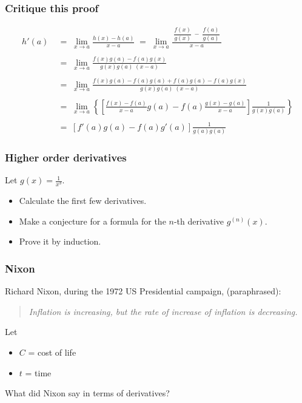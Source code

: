 \begin{frame}[t]
	\fontsize{13}{13}\selectfont
	\frametitle{Critique this proof}
	\vspace{-1cm}
	\begin{align*}
		h'(a) \; & = \; \lim_{x \to a}\frac{h(x) - h(a) }{x - a}\; = \; \lim_{x \to a}\frac{\; \dfrac{f(x)}{g(x)} \; - \; \dfrac{f(a)}{g(a)} \;}{x-a} \\
		\         \\
		         & = \; \lim_{x \to a}\frac{f(x)g(a) - f(a)g(x)}{g(x)g(a) \; (x-a)}                                                                   \\
		\         \\
		         & = \; \lim_{x \to a}\frac{f(x)g(a) - f(a)g(a) + f(a)g(a) - f(a) g(x)}{g(x) g(a) \; (x-a)}                                           \\
		\         \\
		         & = \; \lim_{x \to a}\left\{ \left[ \frac{f(x) - f(a)}{x-a}g(a) - f(a) \frac{g(x) - g(a)}{x-a}\right] \frac{1}{g(x) g(a)}\right\}    \\
		\         \\
		         & = \; \left[ f'(a) g(a) - f(a) g'(a) \right] \frac{1}{g(a) g(a)}
	\end{align*}
\end{frame}

\begin{frame}[t]
	\frametitle{Higher order derivatives}

	Let $\displaystyle g(x) = \frac{1}{x^{3}}$.

	\begin{itemize}
		\item Calculate the first few derivatives.

		\item Make a conjecture for a formula for the $n$-th derivative $\displaystyle
			g^{(n)}(x)$.

		\item Prove it by induction.
	\end{itemize}
\end{frame}

\begin{frame}
	\frametitle{Nixon}

	Richard Nixon, during the 1972 US Presidential campaign, (paraphrased):

	\begin{quote}
		\emph{Inflation is increasing, but the rate of increase of inflation is decreasing.}
	\end{quote}

	\vfill

	Let
	\begin{itemize}
		\item $C$ = cost of life

		\item $t$ = time
	\end{itemize}
	What did Nixon say in terms of derivatives?

	\vfill
\end{frame}

